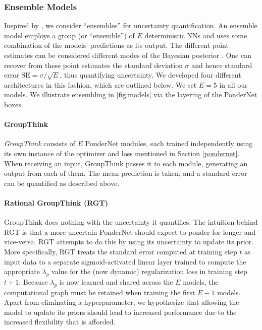 \documentclass{article}
\begin{document}
\subsubsection{Ensemble Models}\label{ensemble}
Inspired by \citet{lakshminarayanan_simple_2017}, we consider ``ensembles'' for uncertainty quantification. An ensemble model employs a group (or ``ensemble'') of $E$ deterministic NNs and uses some combination of the models' predictions as its output. The different point estimates can be considered different modes of the Bayesian posterior \citep{jospin_hands-bayesian_2022}. One can recover from these point estimates the standard deviation $\sigma$ and hence standard error $\text{SE} = \sigma / \sqrt{E}$, thus quantifying uncertainty. We developed four different architectures in this fashion, which are outlined below. We set $E = 5$ in all our models. We illustrate ensembling in \ref{fig:models} via the layering of the PonderNet boxes.

\paragraph{GroupThink} \textit{GroupThink} consists of $E$ PonderNet modules, each trained independently using its own instance of the optimizer and loss mentioned in Section \ref{pondernet}. When receiving an input, GroupThink passes it to each module, generating an output from each of them. The mean prediction is taken, and a standard error can be quantified as described above.

\paragraph{Rational GroupThink (RGT)} GroupThink does nothing with the uncertainty it quantifies. The intuition behind RGT is that a more uncertain PonderNet should expect to ponder for longer and vice-versa. RGT attempts to do this by using its uncertainty to update its prior. More specifically, RGT treats the standard error computed at training step $t$ as input data to a separate sigmoid-activated linear layer trained to compute the appropriate $\lambda_p$ value for the (now dynamic) regularization loss in training step $t+1$. Because $\lambda_p$ is now learned and shared across the $E$ models, the computational graph must be retained when training the first $E-1$ models. Apart from eliminating a hyperparameter, we hypothesize that allowing the model to update its priors should lead to increased performance due to the increased flexibility that is afforded.
\end{document}
